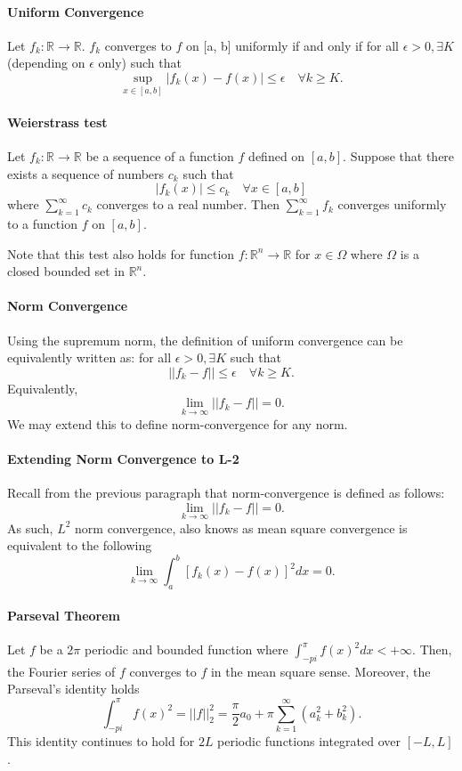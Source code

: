 \documentclass[12pt, letterpaper]{article}
\begin{document}
    \paragraph{Uniform Convergence}
    Let \(f_k: \mathbb{R}\to \mathbb{R}\). \(f_k\) converges to \(f\) on [a, b] uniformly if and only if
    for all \(\epsilon > 0, \exists K\) (depending on \(\epsilon\) only) such that
    \[
    \sup_{x\in [a,b]} |f_k(x) - f(x)| \leq \epsilon \quad\forall k \geq K.
    \]

    \paragraph{Weierstrass test}
    Let \(f_k: \mathbb{R}\to \mathbb{R}\) be a sequence of a function \(f\) defined on \([a, b]\).
    Suppose that there exists a sequence of numbers \(c_k\) such that
    \[|f_k(x)| \leq c_k \quad \forall x\in [a, b]\]
    where \(\sum_{k=1}^\infty c_k\) converges to a real number.
    Then
    \(\sum_{k=1}^\infty f_k\) converges uniformly to a function \(f\) on \([a, b]\).

    Note that this test also holds for function \(f: \mathbb{R}^n \to \mathbb{R}\) for \(x\in \Omega\) where \(\Omega\) is a closed bounded set in \(\mathbb{R}^n\).

    \paragraph{Norm Convergence}
    Using the supremum norm, the definition of uniform convergence can be equivalently written as:
    for all \(\epsilon > 0, \exists K\) such that
    \[
        ||f_k - f|| \leq \epsilon \quad \forall k \geq K.
    \]
    Equivalently,
    \[\lim_{k\to\infty} ||f_k - f|| = 0.\]
    We may extend this to define norm-convergence for any norm.

    \paragraph{Extending Norm Convergence to L-2}
    Recall from the previous paragraph that norm-convergence is defined as follows:
    \[\lim_{k\to\infty} ||f_k - f|| = 0.\]
    As such, \(L^2\) norm convergence, also knows as mean square convergence
    is equivalent to the following
    \[\lim_{k\to\infty} \int_a^b [f_k(x)-f(x)]^2 dx = 0.\]

    \paragraph{Parseval Theorem}
    Let \(f\) be a \(2\pi\) periodic and bounded function where
    \(\int_{-pi}^\pi f(x)^2 dx < +\infty\). Then, the Fourier series of \(f\) converges to \(f\) in the mean square sense. Moreover, the Parseval's
    identity holds
    \[
    \int_{-pi}^\pi f(x)^2 = ||f||_2^2 = \frac{\pi}{2}a_0 +
    \pi \sum_{k=1}^\infty  (a_k^2 +b_k^2).
    \]
    This identity continues to hold for \(2L\) periodic functions integrated
    over \([-L, L]\).
\end{document}
